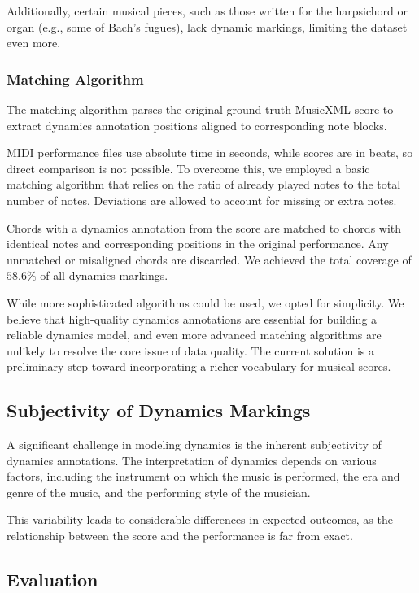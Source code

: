 Additionally, certain musical pieces, such as those written for the harpsichord or organ (e.g., some of Bach's fugues), lack dynamic markings, limiting the dataset even more.

\subsubsection{Matching Algorithm}

The matching algorithm parses the original ground truth MusicXML score to extract dynamics annotation positions aligned to corresponding note blocks.

MIDI performance files use absolute time in seconds, while scores are in beats, so direct comparison is not possible. To overcome this, we employed a basic matching algorithm that relies on the ratio of already played notes to the total number of notes. Deviations are allowed to account for missing or extra notes.

Chords with a dynamics annotation from the score are matched to chords with identical notes and corresponding positions in the original performance. Any unmatched or misaligned chords are discarded. We achieved the total coverage of $58.6\%$ of all dynamics markings.

While more sophisticated algorithms could be used, we opted for simplicity. We believe that high-quality dynamics annotations are essential for building a reliable dynamics model, and even more advanced matching algorithms are unlikely to resolve the core issue of data quality. The current solution is a preliminary step toward incorporating a richer vocabulary for musical scores.

\subsection{Subjectivity of Dynamics Markings}

A significant challenge in modeling dynamics is the inherent subjectivity of dynamics annotations. The interpretation of dynamics depends on various factors, including the instrument on which the music is performed, the era and genre of the music, and the performing style of the musician.

This variability leads to considerable differences in expected outcomes, as the relationship between the score and the performance is far from exact.

\subsection{Evaluation}

